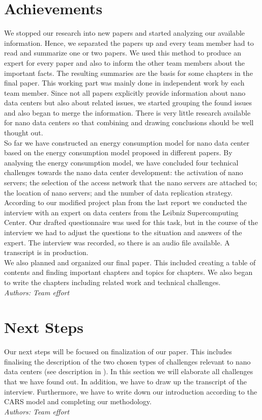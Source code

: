 \documentclass[sigchi-a, authorversion]{acmart}
\begin{document}
\section{Achievements}
\label{sec:achievements}
We stopped our research into new papers and started analyzing our available information. Hence, we separated the papers up and every team member had to read and summarize one or two papers. We used this method to produce an expert for every paper and also to inform the other team members about the important facts. The resulting summaries are the basis for some chapters in the final paper. This working part was mainly done in independent work by each team member. Since not all papers explicitly provide information about nano data centers but also about related issues, we started grouping the found issues and also began to merge the information. There is very little research available for nano data centers so that combining and drawing conclusions should be well thought out.\\
So far we have constructed an energy consumption model for nano data center based on the energy consumption model proposed in different papers. By analysing the energy consumption model, we have concluded four technical challenges towards the nano data center development: the activation of nano servers; the selection of the access network that the nano servers are attached to; the location of nano servers; and the number of data replication strategy.\\
According to our modified project plan from the last report we conducted the interview with an expert on data centers from the Leibniz Supercomputing Center. Our drafted questionnaire was used for this task, but in the course of the interview we had to adjust the questions to the situation and answers of the expert. The interview was recorded, so there is an audio file available. A transcript is in production.\\
We also planned and organized our final paper. This included creating a table of contents and finding important chapters and topics for chapters. We also began to write the chapters including related work and technical challenges.\\
\textit{Authors: Team effort}\\

\section{Next Steps}
\label{sec:next_steps}
Our next steps will be focused on finalization of our paper. This includes finalising the description of the two chosen types of challenges relevant to nano data centers (see description in ). In this section we will elaborate all challenges that we have found out. In addition, we have to draw up the transcript of the interview. Furthermore, we have to write down our introduction according to the CARS model and completing our methodology.\\
\textit{Authors: Team effort}\\
\end{document}
